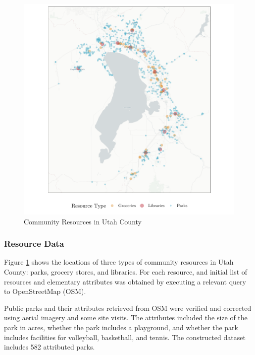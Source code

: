 \documentclass[3p, authoryear, review]{elsarticle} %
\begin{document}
\begin{figure}

{\centering \includegraphics{Community_Resources_files/figure-latex/utco-map-1} 

}

\caption{Community Resources in Utah County}\label{fig:utco-map}
\end{figure}

\hypertarget{resource-data}{%
\subsubsection{Resource Data}\label{resource-data}}

Figure \ref{fig:utco-map} shows the locations of three types of
community resources in Utah County: parks, grocery stores, and libraries.
For each resource, and initial list of resources and elementary attributes was
obtained by executing a relevant query to OpenStreetMap (OSM).

Public parks and their attributes retrieved from OSM were verified and
corrected using aerial imagery and some site visits. The attributes included
the size of the park in acres, whether the park includes a playground, and
whether the park includes facilities for volleyball, basketball, and tennis.
The constructed dataset includes 582 attributed parks.
\end{document}
